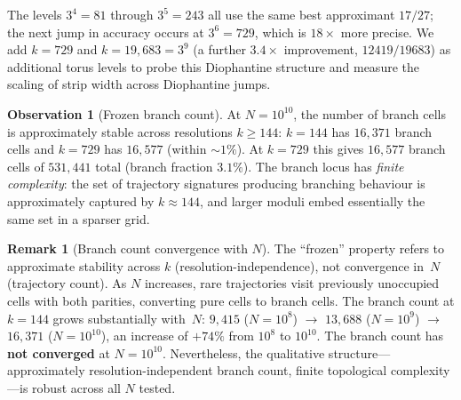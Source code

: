 \documentclass[11pt,a4paper]{article}
\theoremstyle{plain}
\theoremstyle{definition}
\newtheorem{remark}[theorem]{Remark}
\newtheorem{observation}[theorem]{Observation}
\begin{document}
\noindent
The levels $3^4 = 81$ through $3^5 = 243$ all use the same best
approximant $17/27$; the next jump in accuracy occurs at $3^6 = 729$,
which is $18\times$ more precise.  We add $k = 729$ and $k = 19{,}683 = 3^9$
(a further $3.4\times$ improvement, $12419/19683$) as additional
torus levels to probe this Diophantine structure and measure the
scaling of strip width across Diophantine jumps.

\begin{observation}[Frozen branch count]
\label{obs:frozen-branch}
    At $N = 10^{10}$, the number of branch cells is approximately
    stable across resolutions $k \geq 144$: $k = 144$ has $16{,}371$
    branch cells and $k = 729$ has $16{,}577$ (within ${\sim}1\%$).
    At $k = 729$ this gives $16{,}577$ branch cells of $531{,}441$
    total (branch fraction $3.1\%$).  The branch locus
    has \emph{finite complexity}: the set of trajectory signatures
    producing branching behaviour is approximately captured by
    $k \approx 144$, and larger moduli embed essentially the same set
    in a sparser grid.
\end{observation}

\begin{remark}[Branch count convergence with $N$]
\label{rem:branch-convergence}
    The ``frozen'' property refers to approximate stability across $k$
    (resolution-independence), not convergence in~$N$ (trajectory count).
    As $N$ increases, rare trajectories visit previously unoccupied
    cells with both parities, converting pure cells to branch cells.
    The branch count at $k = 144$ grows substantially with~$N$:
    $9{,}415$ ($N = 10^8$) $\to$ $13{,}688$ ($N = 10^9$) $\to$
    $16{,}371$ ($N = 10^{10}$), an increase of $+74\%$ from $10^8$
    to $10^{10}$.  The branch count has \textbf{not converged} at
    $N = 10^{10}$.  Nevertheless, the qualitative
    structure---approximately resolution-independent branch count,
    finite topological complexity---is robust across all $N$ tested.
\end{remark}
\end{document}

